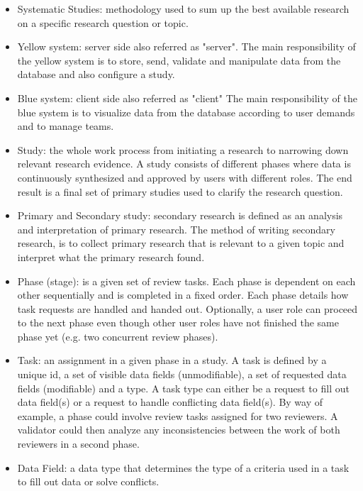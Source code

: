 	\begin{itemize}
	  \item Systematic Studies: methodology used to sum up the best available research on a specific research question or topic.  
	  \item Yellow system: server side also referred as "server". The main responsibility of the yellow system is to store, send, validate and manipulate data from the database and also configure a study.
	  \item Blue system: client side also referred as "client" The main responsibility of the blue system is to visualize data from the database according to user demands and to manage teams.
	  \item Study: the whole work process from initiating a research to narrowing down relevant research evidence. A study consists of different phases where data is continuously synthesized and approved by users with different roles. The end result is a final set of primary studies used to clarify the research question. 
	  \item Primary and Secondary study: secondary research is defined as an analysis and interpretation of primary research. The method of writing secondary research, is to collect primary research that is relevant to a given topic and interpret what the primary research found.
	  \item Phase (stage): is a given set of review tasks. Each phase is dependent on each other sequentially and is completed in a fixed order. Each phase details how task requests are handled and handed out. Optionally, a user role can proceed to the next phase even though other user roles have not finished the same phase yet (e.g. two concurrent review phases).
	  \item Task: an assignment in a given phase in a study. A task is defined by a unique id, a set of visible data fields (unmodifiable), a set of requested data fields (modifiable) and a type. A task type can either be a request to fill out data field(s) or a request to handle conflicting data field(s). By way of example, a phase could involve review tasks assigned for two reviewers. A validator could then analyze any inconsistencies between the work of both reviewers in a second phase.
	  \item Data Field: a data type that determines the type of a criteria used in a task to fill out data or solve conflicts. %

\end{itemize}
